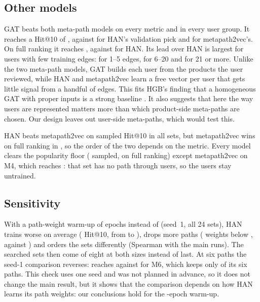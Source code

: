 \subsection{Other models}
\label{sec:res-models}

GAT beats both meta-path models on every metric and in every user group. It reaches a Hit@10 of
, against  for HAN's validation pick and
 for metapath2vec's. On full ranking it reaches , against
 for HAN. Its lead over HAN is largest for users with few training edges:
 for 1--5 edges,  for 6--20 and  for 21 or
more. Unlike the two meta-path models, GAT builds each user from the products the user reviewed,
while HAN and metapath2vec learn a free vector per user that gets little signal from a handful of
edges. This fits HGB's finding that a homogeneous GAT with proper inputs is a strong baseline
\citep{lv2021hgb}. It also suggests that here the way users are represented matters more than which
product-side meta-paths are chosen. Our design leaves out user-side meta-paths, which would test
this.

HAN beats metapath2vec on sampled Hit@10 in all  sets, but metapath2vec wins on
full ranking in , so the order of the two depends on the metric. Every model
clears the popularity floor ( sampled,  on full ranking) except
metapath2vec on M4, which reaches : that set has no path through users, so the
users stay untrained.

\subsection{Sensitivity}
\label{sec:res-sensitivity}

With a path-weight warm-up of  epochs instead of 
(seed~1, all 24 sets), HAN trains worse on average ( Hit@10, from
 to ), drops more paths ( weights below
, against ) and orders the sets differently (Spearman
 with the main runs). The searched sets then come  of eight at both
sizes instead of last. At six paths the seed-1 comparison reverses:  reaches
 against  for M6, which keeps only  of its six
paths. This check uses one seed and was not planned in advance, so it does not change the main
result, but it shows that the comparison depends on how HAN learns its path weights: our
conclusions hold for the -epoch warm-up.
